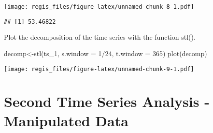 \documentclass[
]{article}
\newenvironment{Shaded}{\begin{snugshade}}{\end{snugshade}}
\newcommand{\AttributeTok}[1]{\textcolor[rgb]{0.77,0.63,0.00}{#1}}
\newcommand{\DecValTok}[1]{\textcolor[rgb]{0.00,0.00,0.81}{#1}}
\newcommand{\FloatTok}[1]{\textcolor[rgb]{0.00,0.00,0.81}{#1}}
\newcommand{\FunctionTok}[1]{\textcolor[rgb]{0.00,0.00,0.00}{#1}}
\newcommand{\NormalTok}[1]{#1}
\newcommand{\OtherTok}[1]{\textcolor[rgb]{0.56,0.35,0.01}{#1}}
\newcommand{\SpecialCharTok}[1]{\textcolor[rgb]{0.00,0.00,0.00}{#1}}
\newcommand{\StringTok}[1]{\textcolor[rgb]{0.31,0.60,0.02}{#1}}
\begin{document}
\begin{Shaded}
\end{Shaded}

\texttt{[image: regis\_files/figure-latex/unnamed-chunk-8-1.pdf]}

\begin{Shaded}
\end{Shaded}

\begin{verbatim}
## [1] 53.46822
\end{verbatim}

Plot the decomposition of the time series with the function stl().

\begin{Shaded}
\begin{Highlighting}[]
\NormalTok{decomp}\OtherTok{\textless{}{-}}\FunctionTok{stl}\NormalTok{(ts\_1, }\AttributeTok{s.window =} \DecValTok{1}\SpecialCharTok{/}\DecValTok{24}\NormalTok{, }\AttributeTok{t.window =} \DecValTok{365}\NormalTok{)}
\FunctionTok{plot}\NormalTok{(decomp)}
\end{Highlighting}
\end{Shaded}

\texttt{[image: regis\_files/figure-latex/unnamed-chunk-9-1.pdf]}

\hypertarget{second-time-series-analysis---manipulated-data}{%
\section{Second Time Series Analysis - Manipulated
Data}\label{second-time-series-analysis---manipulated-data}}
\end{document}
